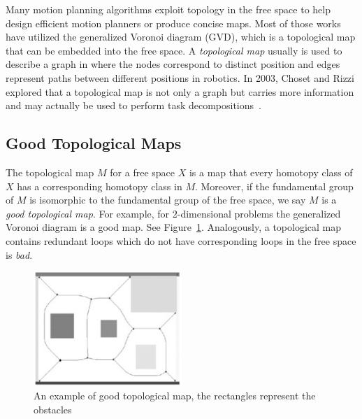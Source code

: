 
Many motion planning algorithms exploit topology in the free space to help design efficient motion planners or produce concise maps. Most of those works have utilized the generalized Voronoi diagram (GVD), which is a topological map that can be embedded into the free space.
A \emph{topological map} usually is used to describe a graph in where the nodes correspond to distinct position and edges represent paths between different positions in robotics. In 2003, Choset and Rizzi explored that a topological map is not only a graph but carries more information and may actually be used to perform task decompositions~\cite{DBLP:conf/isrr/ChosetR03}.

\subsection{Good Topological Maps}
The topological map \(M\) for a free space \(X\) is a map that every homotopy class of \(X\) has a corresponding homotopy class in \(M\). Moreover, if the fundamental group of \(M\) is isomorphic to the fundamental group of the free space, we say \(M\) is a \emph{good topological map}. For example, for \(2\)-dimensional problems the generalized Voronoi diagram is a good map. See Figure~\ref{fig:gvd}. Analogously, a topological map contains redundant loops which do not have corresponding loops in the free space is \emph{bad}.
\begin{figure}
  \centering
  \includegraphics[width=0.5\textwidth]{fig-gvd}
  \caption{An example of good topological map, the rectangles represent the obstacles}
  \label{fig:gvd}
\end{figure}

